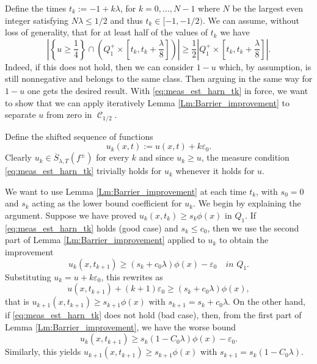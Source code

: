 \documentclass[12pt]{article}
\makeatletter
\newenvironment{customproof}[1]{%
  \par\pushQED{\qed}%
  \normalfont\topsep6pt \trivlist
  \item[\hskip\labelsep\itshape
    Proof of #1\@addpunct{.}]\ignorespaces
}{%
  \popQED\endtrivlist\@endpefalse
}
\numberwithin{Theorem}{section}
\theoremstyle{definition}
\theoremstyle{remark}
\numberwithin{equation}{section}
\DeclareMathOperator{\C}{\mathcal{C}}
\newcommand{\eps}{\varepsilon}
\makeatother
\begin{document}
\begin{customproof}{Lemma \ref{Lm:Harnack1}}
    
    Define the times $t_k:=-1+k\lambda$, for $k=0, \dots, N-1$ where \(N\) be the largest even integer satisfying \(N\lambda\le1/2\) and thus $t_k\in[-1,-1/2)$. We can assume, without loss of generality, that for at least half of the values of $t_k$ we have 
    \begin{equation} \label{eq:meas_est_harn_tk}
    \left| \left\{ u \geq \frac{1}{4} \right\} \cap \left( Q_1^+ \times \left[t_k, t_k+\frac{\lambda}{8} \right]\right) \right| \geq \frac{1}{2} \left|Q_1^+ \times \left[t_k, t_k+\frac{\lambda}{8} \right] \right|.
    \end{equation}
    Indeed, if this does not hold, then we can consider $1-u$ which, by assumption, is still nonnegative and belongs to the same class. Then arguing in the same way for $1-u$ one gets the desired result. With \eqref{eq:meas_est_harn_tk} in force, we want to show that we can apply iteratively Lemma \ref{Lm:Barrier_improvement} to separate $u$ from zero in $\C_{1/2}$. 
    
    Define the shifted sequence of functions
    \[
        u_k(x,t) := u(x,t) + k\eps_0.
    \]
    Clearly $u_k \in \overline{S}_{\lambda,T}(f^\pm)$ for every $k$ and since $u_k \geq u$, the measure condition \eqref{eq:meas_est_harn_tk} trivially holds for $u_k$ whenever it holds for $u$.

    We want to use Lemma \ref{Lm:Barrier_improvement} at each time $t_k$, with $s_0=0$ and $s_k$ acting as the lower bound coefficient for $u_k$. We begin by explaining the argument. Suppose we have proved $u_k(x,t_k) \geq s_k\phi(x)$ in $Q_1$. If \eqref{eq:meas_est_harn_tk} holds (good case) and $s_k \leq c_0$, then we use the second part of Lemma \ref{Lm:Barrier_improvement} applied to $u_k$ to obtain the improvement
    \[
    u_k(x,t_{k+1}) \geq (s_k+c_0\lambda)\phi(x) - \eps_0 \quad \textit{in }Q_1.
    \]
    Substituting $u_k = u + k\eps_0$, this rewrites as
    \[
    u(x,t_{k+1}) + (k+1)\eps_0 \geq (s_k+c_0\lambda)\phi(x)  ,
    \]
    that is $u_{k+1}(x, t_{k+1}) \geq s_{k+1}\phi(x)$  with $s_{k+1} = s_k + c_0\lambda$.
    On the other hand, if \eqref{eq:meas_est_harn_tk} does not hold (bad case), then, from the first part of Lemma \ref{Lm:Barrier_improvement}, we have the worse bound
    \[
    u_k(x,t_{k+1}) \geq s_k(1-C_0\lambda)\phi(x) - \eps_0. 
    \]
    Similarly, this yields $u_{k+1}(x, t_{k+1}) \geq s_{k+1}\phi(x)$ with $s_{k+1} = s_k(1-C_0\lambda)$.


\end{customproof}
\end{document}
